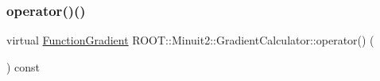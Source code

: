 \subsubsection{\texorpdfstring{operator()()}{operator()()}\hspace{0.1cm}{\footnotesize\ttfamily [3/6]}}
{\footnotesize\ttfamily virtual \mbox{\hyperlink{classROOT_1_1Minuit2_1_1FunctionGradient}{Function\+Gradient}} R\+O\+O\+T\+::\+Minuit2\+::\+Gradient\+Calculator\+::operator() (\begin{DoxyParamCaption}\item[{const \mbox{\hyperlink{classROOT_1_1Minuit2_1_1MinimumParameters}{Minimum\+Parameters}} \&}]{ }\end{DoxyParamCaption}) const\hspace{0.3cm}{\ttfamily [pure virtual]}}



